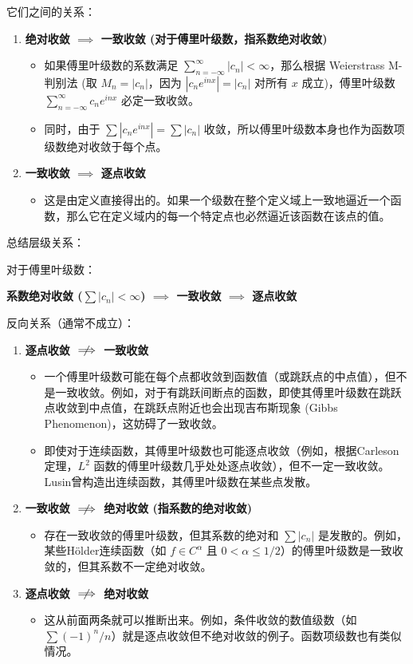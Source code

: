它们之间的关系：

\begin{enumerate}
	\item \textbf{绝对收敛 $\implies$ 一致收敛 (对于傅里叶级数，指系数绝对收敛)}
	\begin{itemize}
		\item 如果傅里叶级数的系数满足 $\sum_{n=-\infty}^{\infty} |c_n| < \infty$，那么根据 Weierstrass M-判别法 (取 $M_n = |c_n|$，因为 $|c_n e^{inx}| = |c_n|$ 对所有 $x$ 成立)，傅里叶级数 $\sum_{n=-\infty}^{\infty} c_n e^{inx}$ 必定一致收敛。
		\item 同时，由于 $\sum |c_n e^{inx}| = \sum |c_n|$ 收敛，所以傅里叶级数本身也作为函数项级数绝对收敛于每个点。
	\end{itemize}
	\item \textbf{一致收敛 $\implies$ 逐点收敛}
	\begin{itemize}
		\item 这是由定义直接得出的。如果一个级数在整个定义域上一致地逼近一个函数，那么它在定义域内的每一个特定点也必然逼近该函数在该点的值。
	\end{itemize}
\end{enumerate}

总结层级关系：

对于傅里叶级数：

\textbf{系数绝对收敛 ($\sum |c_n| < \infty$) $\implies$ 一致收敛 $\implies$ 逐点收敛}

反向关系（通常不成立）：

\begin{enumerate}
	\item \textbf{逐点收敛 $\centernot{\implies}$ 一致收敛}
	\begin{itemize}
		\item 一个傅里叶级数可能在每个点都收敛到函数值（或跳跃点的中点值），但不是一致收敛。例如，对于有跳跃间断点的函数，即使其傅里叶级数在跳跃点收敛到中点值，在跳跃点附近也会出现吉布斯现象 (Gibbs Phenomenon)，这妨碍了一致收敛。
		\item 即使对于连续函数，其傅里叶级数也可能逐点收敛（例如，根据Carleson定理，$L^2$ 函数的傅里叶级数几乎处处逐点收敛），但不一定一致收敛。Lusin曾构造出连续函数，其傅里叶级数在某些点发散。
	\end{itemize}
	\item \textbf{一致收敛 $\centernot{\implies}$ 绝对收敛 (指系数的绝对收敛)}
	\begin{itemize}
		\item 存在一致收敛的傅里叶级数，但其系数的绝对和 $\sum |c_n|$ 是发散的。例如，某些Hölder连续函数（如 $f \in C^\alpha$ 且 $0 < \alpha \le 1/2$）的傅里叶级数是一致收敛的，但其系数不一定绝对收敛。
	\end{itemize}
	\item \textbf{逐点收敛 $\centernot{\implies}$ 绝对收敛}
	\begin{itemize}
		\item 这从前面两条就可以推断出来。例如，条件收敛的数值级数（如 $\sum (-1)^n/n$）就是逐点收敛但不绝对收敛的例子。函数项级数也有类似情况。
	\end{itemize}
\end{enumerate}

